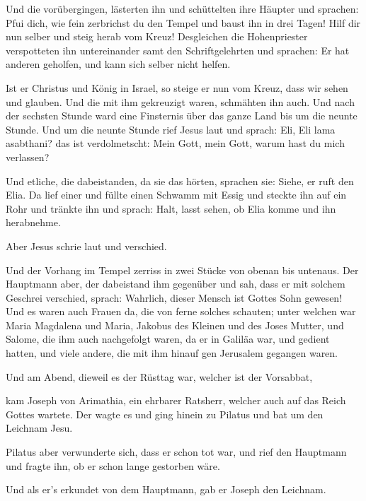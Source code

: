  Und die vorübergingen, lästerten ihn und schüttelten
ihre Häupter und sprachen: Pfui dich, wie fein zerbrichst du den Tempel
und baust ihn in drei Tagen!  Hilf dir nun selber und
steig herab vom Kreuz!  Desgleichen die Hohenpriester
verspotteten ihn untereinander samt den Schriftgelehrten und sprachen:
Er hat anderen geholfen, und kann sich selber nicht helfen.

 Ist er Christus und König in Israel, so steige er nun
vom Kreuz, dass wir sehen und glauben. Und die mit ihm gekreuzigt waren,
schmähten ihn auch.  Und nach der sechsten Stunde ward
eine Finsternis über das ganze Land bis um die neunte Stunde.
 Und um die neunte Stunde rief Jesus laut und sprach:
Eli, Eli lama asabthani? das ist verdolmetscht: Mein Gott, mein Gott,
warum hast du mich verlassen?

 Und etliche, die dabeistanden, da sie das hörten,
sprachen sie: Siehe, er ruft den Elia.  Da lief einer und
füllte einen Schwamm mit Essig und steckte ihn auf ein Rohr und tränkte
ihn und sprach: Halt, lasst sehen, ob Elia komme und ihn herabnehme.

 Aber Jesus schrie laut und verschied.

 Und der Vorhang im Tempel zerriss in zwei Stücke von
obenan bis untenaus.  Der Hauptmann aber, der dabeistand
ihm gegenüber und sah, dass er mit solchem Geschrei verschied, sprach:
Wahrlich, dieser Mensch ist Gottes Sohn gewesen!  Und es
waren auch Frauen da, die von ferne solches schauten; unter welchen war
Maria Magdalena und Maria, Jakobus des Kleinen und des Joses Mutter, und
Salome,  die ihm auch nachgefolgt waren, da er in Galiläa
war, und gedient hatten, und viele andere, die mit ihm hinauf gen
Jerusalem gegangen waren.

 Und am Abend, dieweil es der Rüsttag war, welcher ist
der Vorsabbat,

 kam Joseph von Arimathia, ein ehrbarer Ratsherr, welcher
auch auf das Reich Gottes wartete. Der wagte es und ging hinein zu
Pilatus und bat um den Leichnam Jesu.

 Pilatus aber verwunderte sich, dass er schon tot war,
und rief den Hauptmann und fragte ihn, ob er schon lange gestorben wäre.

 Und als er's erkundet von dem Hauptmann, gab er Joseph
den Leichnam.


